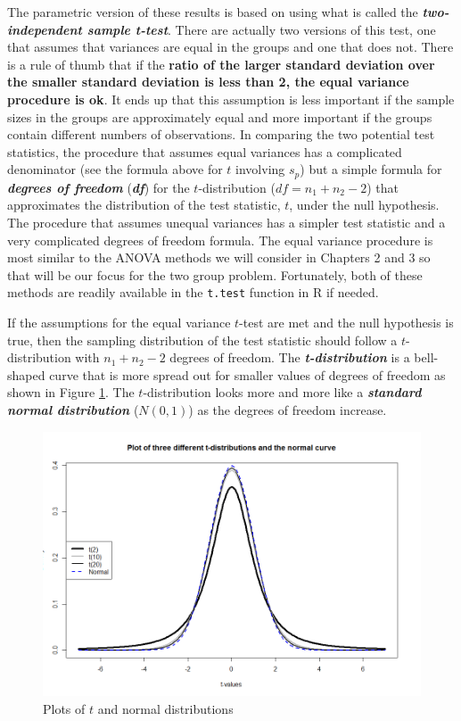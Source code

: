 \documentclass[]{book}
\begin{document}
The parametric version of these results is based on using what is called
the \textbf{\emph{two-independent sample t-test}}. There are actually
two versions of this test, one that assumes that variances are equal in
the groups and one that does not. There is a rule of thumb that if the
\textbf{ratio of the larger standard deviation over the smaller standard
deviation is less than 2, the equal variance procedure is ok}. It ends
up that this assumption is less important if the sample sizes in the
groups are approximately equal and more important if the groups contain
different numbers of observations. In comparing the two potential test
statistics, the procedure that assumes equal variances has a complicated
denominator (see the formula above for \(t\) involving \(s_p\)) but a
simple formula for \textbf{\emph{degrees of freedom}}
(\textbf{\emph{df}}) for the \(t\)-distribution (\(df=n_1+n_2-2\)) that
approximates the distribution of the test statistic, \(t\), under the
null hypothesis. The procedure that assumes unequal variances has a
simpler test statistic and a very complicated degrees of freedom
formula. The equal variance procedure is most similar to the ANOVA
methods we will consider in Chapters 2 and 3 so that will be our focus
for the two group problem. Fortunately, both of these methods are
readily available in the \texttt{t.test} function in R if needed.

If the assumptions for the equal variance \(t\)-test are met and the
null hypothesis is true, then the sampling distribution of the test
statistic should follow a \(t\)-distribution with \(n_1+n_2-2\) degrees
of freedom. The \textbf{\emph{t-distribution}} is a bell-shaped curve
that is more spread out for smaller values of degrees of freedom as
shown in Figure \ref{fig:Figure2-13}. The \(t\)-distribution looks more
and more like a \textbf{\emph{standard normal distribution}}
(\(N(0,1)\)) as the degrees of freedom increase.



\begin{figure}
\includegraphics[width=13.33in]{chapter1_files/image045} \caption{Plots of \(t\) and normal distributions}\label{fig:Figure2-13}
\end{figure}
\end{document}
